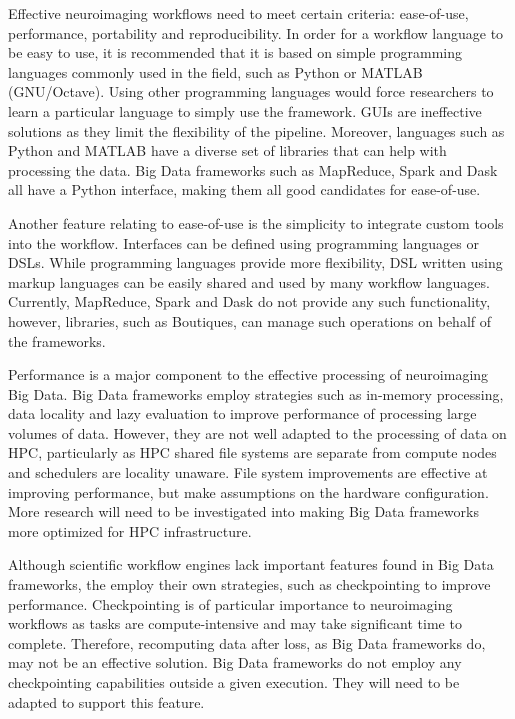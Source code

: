         Effective neuroimaging workflows need to meet certain criteria:
        ease-of-use, performance, portability and reproducibility. In order 
        for a workflow language to be easy to
        use, it is recommended that it is based on simple programming languages
        commonly used in the field, such as Python or MATLAB (GNU/Octave). Using
        other programming languages would force researchers to learn a
        particular language to simply use the framework. GUIs are ineffective
        solutions as they limit the flexibility of the pipeline. Moreover,
        languages such as Python and MATLAB have a diverse set of libraries that
        can help with processing the data. Big Data frameworks such as
        MapReduce, Spark and Dask all have a Python interface, making them all
        good candidates for ease-of-use.


        Another feature relating to ease-of-use is the simplicity to integrate
        custom tools into the workflow. Interfaces can be defined using
        programming languages or DSLs. While programming languages provide more
        flexibility, DSL written using markup languages can be easily shared and
        used by many workflow languages. Currently, MapReduce, Spark and Dask do
        not provide any such functionality, however, libraries, such as
        Boutiques, can manage such operations on behalf of the frameworks.


        Performance is a major component to the effective processing of
        neuroimaging Big Data. Big Data frameworks employ strategies such as
        in-memory processing, data locality and lazy evaluation to improve
        performance of processing large volumes of data. However, they are not
        well adapted to the processing of data on HPC, particularly as HPC
        shared file systems are separate from compute nodes and schedulers are
        locality unaware. File system improvements are effective at improving
        performance, but make assumptions on the hardware configuration. More
        research will need to be investigated into making Big Data frameworks
        more optimized for HPC infrastructure.

        Although scientific workflow engines lack important features found in
        Big Data frameworks, the employ their own strategies, such as
        checkpointing to improve performance. Checkpointing is of particular
        importance to neuroimaging workflows as tasks are compute-intensive and
        may take significant time to complete. Therefore, recomputing data after
        loss, as Big Data frameworks do, may not be an effective solution. Big
        Data frameworks do not employ any checkpointing capabilities outside
        a given execution. They will need to be adapted to support this feature.



